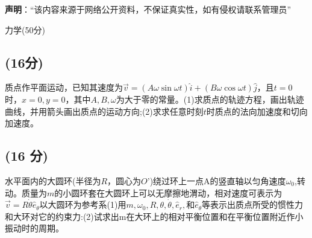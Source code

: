 
\textbf{声明}：“该内容来源于网络公开资料，不保证真实性，如有侵权请联系管理员”

力学(50分)
\subsection{(16分)}
质点作平面运动，已知其速度为$\vec{v} = (A \omega \sin \omega t) \hat{i} + (B \omega \cos \omega t) \hat{j}$，且$t=0$时，$x=0,y=0$，其中$A,B,\omega$为大于零的常量。(1)求质点的轨迹方程，画出轨迹曲线，并用箭头画出质点的运动方向;(2)求求任意时刻$t$时质点的法向加速度和切向
加速度。
\subsection{(16 分)}
水平面内的大圆环(半径为$R$，圆心为$O$’)绕过环上一点A的竖直轴以匀角速度$\omega_0$,转动。质量为$m$的小圆环套在大圆环上可以无摩擦地渭动，相对速度可表示为$\vec{v} =R\dot{\theta}\hat e_\theta$以大圆环为参考系(1)用$m,\omega_0,R,\theta,\dot{\theta},\hat e_r,$和$\hat e_\theta$等表示出质点所受的惯性力和大环对它的约束力:(2)试求出m在大环上的相对平衡位置和在平衡位置附近作小振动时的周期。






